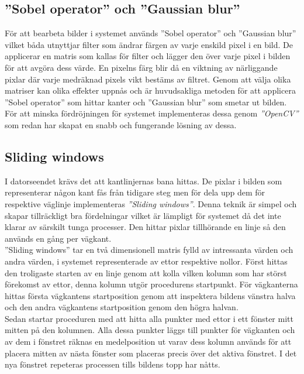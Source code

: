 \documentclass[10pt,oneside,swedish]{lips}
\begin{document}

\subsection{''Sobel operator'' och ''Gaussian blur''}
För att bearbeta bilder i systemet används ''Sobel operator'' och ''Gaussian blur'' vilket båda utnyttjar filter som ändrar färgen av varje enskild pixel i en bild. De applicerar en matris som kallas för filter och lägger den över varje pixel i bilden för att avgöra dess värde. En pixelns färg blir då en viktning av närliggande pixlar där varje medräknad pixels vikt bestäms av filtret. Genom att välja olika matriser kan olika effekter uppnås och är huvudsakliga metoden för att applicera ''Sobel operator'' som hittar kanter och ''Gaussian blur'' som smetar ut bilden.
För att minska fördröjningen för systemet implementeras dessa genom \emph{''OpenCV''} som redan har skapat en snabb och fungerande lösning av dessa.

\subsection{Sliding windows}
I datorseendet krävs det att kantlinjernas bana hittas. De pixlar i bilden som representerar någon kant fås från tidigare steg men för dela upp dem för respektive väglinje implementeras \emph{''Sliding windows''}. Denna teknik är simpel och skapar tillräckligt bra fördelningar vilket är lämpligt för systemet då det inte klarar av särskilt tunga processer. Den hittar pixlar tillhörande en linje så den används en gång per vägkant. \\

\noindent
''Sliding windows'' tar en två dimensionell matris fylld av intressanta värden och andra värden, i systemet representerade av ettor respektive nollor. Först hittas den troligaste starten av en linje genom att kolla vilken kolumn som har störst förekomst av ettor, denna kolumn utgör procedurens startpunkt. För vägkanterna hittas första vägkantens startposition genom att inspektera bildens vänstra halva och den andra vägkantens startposition genom den högra halvan. \\

\noindent
Sedan startar proceduren med att hitta alla punkter med ettor i ett fönster mitt mitten på den kolumnen. Alla dessa punkter läggs till punkter för vägkanten och av dem i fönstret räknas en medelposition ut varav dess kolumn används för att placera mitten av nästa fönster som placeras precis över det aktiva fönstret. I det nya fönstret repeteras processen tills bildens topp har nåtts. \\
\end{document}
